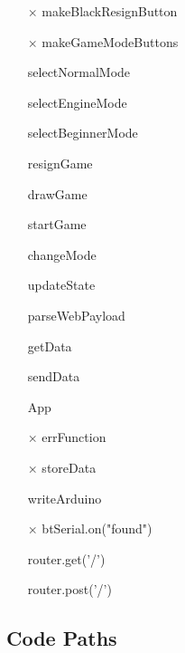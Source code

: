 \documentclass[12pt, titlepage]{article}
\begin{document}
\begin{itemize}
  \item[$\times$] makeBlackResignButton
  \item[$\times$] makeGameModeButtons
  \item[\checkmark] selectNormalMode
  \item[\checkmark] selectEngineMode
  \item[\checkmark] selectBeginnerMode
  \item[\checkmark] resignGame
  \item[\checkmark] drawGame
  \item[\checkmark] startGame
  \item[\checkmark] changeMode
  \item[\checkmark] updateState
  \item[\checkmark] parseWebPayload
  \item[\checkmark] getData
  \item[\checkmark] sendData
  \item[\checkmark] App
  \item[$\times$] errFunction
  \item[$\times$] storeData
  \item[\checkmark] writeArduino
  \item[$\times$] btSerial.on("found")
  \item[\checkmark] router.get('/')
  \item[\checkmark] router.post('/')
\end{itemize}

\subsection{Code Paths}\label{CodePaths}
\end{document}
